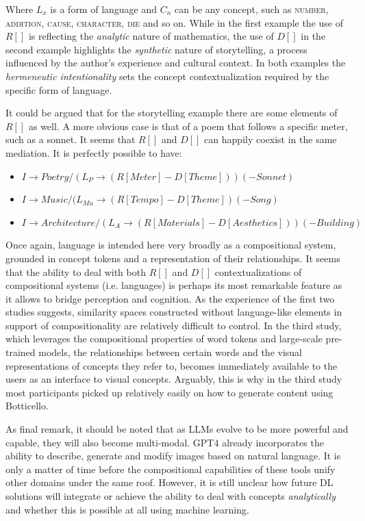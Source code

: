 Where $L_x$ is a form of language and $C_n$ can be any concept, such as \textsc{number}, \textsc{addition}, \textsc{cause}, \textsc{character}, \textsc{die} and so on. While in the first example the use of $R[]$ is reflecting the \emph{analytic} nature of mathematics, the use of $D[]$ in the second example highlights the \emph{synthetic} nature of storytelling, a process influenced by the author's experience and cultural context. In both examples the \emph{hermeneutic intentionality} \citep{Ihde1993} sets the concept contextualization required by the specific form of language. 

It could be argued that for the storytelling example there are some elements of $R[]$ as well. A more obvious case is that of a poem that follows a specific meter, such as a sonnet. It seems that $R[]$ and $D[]$ can happily coexist in the same mediation. It is perfectly possible to have:

\begin{itemize}
	\singlespacing
	\item $ I \rightarrow Poetry / (L_P \rightarrow (R[Meter] - D[Theme] )) (- Sonnet) $
	\item  $ I \rightarrow Music / (L_{Mu} \rightarrow (R[Tempo] - D[Theme]) (- Song) $
	\item $ I \rightarrow Architecture / (L_A \rightarrow (R[Materials] - D[Aesthetics])) (- Building) $
\end{itemize}

Once again, language is intended here very broadly as a compositional system, grounded in concept tokens and a representation of their relationships. 
It seems that the ability to deal with both $R[]$ and $D[]$ contextualizations of compositional systems (i.e. languages) is perhaps its most remarkable feature as it allows to bridge perception and cognition. As the experience of the first two studies suggests, similarity spaces constructed without language-like elements in support of compositionality are relatively difficult to control. In the third study, which leverages the compositional properties of word tokens and large-scale pre-trained models, the relationships between certain words and the visual representations of concepts they refer to, becomes immediately available to the users as an interface to visual concepts. Arguably, this is why in the third study most participants picked up relatively easily on how to generate content using Botticello.

As final remark, it should be noted that as LLMs evolve to be more powerful and capable, they will also become multi-modal. GPT4 already incorporates the ability to describe, generate and modify images based on natural language. It is only a matter of time before the compositional capabilities of these tools unify other domains under the same roof. However, it is still unclear how future DL solutions will integrate or achieve the ability to deal with concepts \emph{analytically} and whether this is possible at all using machine learning. 

